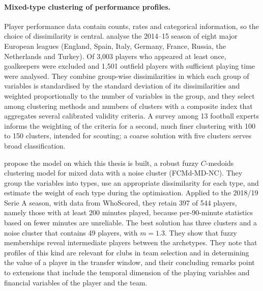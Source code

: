 \paragraph{Mixed-type clustering of performance profiles.} Player performance data contain counts, rates and categorical information, so the choice of dissimilarity is central.  analyse the 2014--15 season of eight major European leagues (England, Spain, Italy, Germany, France, Russia, the Netherlands and Turkey). Of 3,003 players who appeared at least once, goalkeepers were excluded and 1,501 outfield players with sufficient playing time were analysed. They combine group-wise dissimilarities in which each group of variables is standardised by the standard deviation of its dissimilarities and weighted proportionally to the number of variables in the group, and they select among clustering methods and numbers of clusters with a composite index that aggregates several calibrated validity criteria. A survey among 13 football experts informs the weighting of the criteria for a second, much finer clustering with 100 to 150 clusters, intended for scouting; a coarse solution with five clusters serves broad classification.

 propose the model on which this thesis is built, a robust fuzzy $C$-medoids clustering model for mixed data with a noise cluster (FCMd-MD-NC). They group the variables into types, use an appropriate dissimilarity for each type, and estimate the weight of each type during the optimisation. Applied to the 2018/19 Serie A season, with data from WhoScored, they retain 397 of 544 players, namely those with at least 200 minutes played, because per-90-minute statistics based on fewer minutes are unreliable. The best solution has three clusters and a noise cluster that contains 49 players, with $m=1.3$. They show that fuzzy memberships reveal intermediate players between the archetypes. They note that profiles of this kind are relevant for clubs in team selection and in determining the value of a player in the transfer window, and their concluding remarks point to extensions that include the temporal dimension of the playing variables and financial variables of the player and the team.

